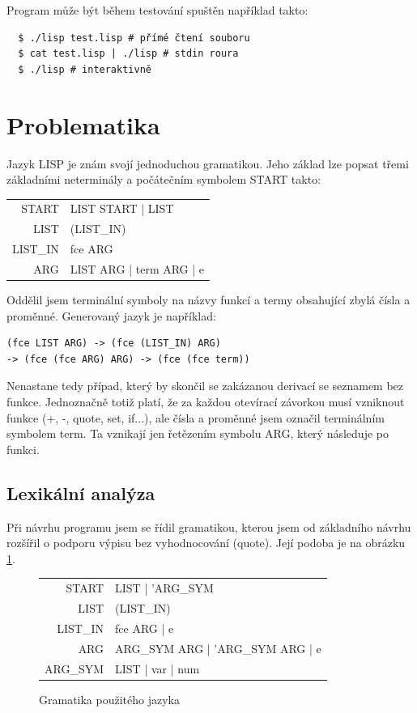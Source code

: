 \documentclass[a4paper, 12pt]{article}
\begin{document}
Program může být během testování spuštěn například takto:
\begin{verbatim}
  $ ./lisp test.lisp # přímé čtení souboru
  $ cat test.lisp | ./lisp # stdin roura
  $ ./lisp # interaktivně
\end{verbatim}

\section{Problematika}
Jazyk LISP je znám svojí jednoduchou gramatikou.
Jeho základ lze popsat třemi základními neterminály a počátečním
symbolem START takto: 

\medskip

\begin{tabular}{r@{$\quad\longrightarrow\quad$}l}
START & LIST START | LIST\\
LIST & (LIST\_IN)\\
LIST\_IN & fce ARG\\
ARG & LIST ARG | term ARG | e
\end{tabular}

Oddělil jsem terminální symboly na názvy funkcí a termy obsahující
zbylá čísla a proměnné. Generovaný jazyk je například:

\begin{verbatim}
(fce LIST ARG) -> (fce (LIST_IN) ARG)
-> (fce (fce ARG) ARG) -> (fce (fce term))
\end{verbatim}

Nenastane tedy případ, který by skončil se zakázanou derivací
se seznamem bez funkce.
Jednoznačně totiž platí, že za každou otevírací závorkou musí
vzniknout funkce (+, -, quote, set, if...), ale čísla a proměnné
jsem označil terminálním symbolem term. Ta vznikají jen řetězením
symbolu ARG, který následuje po funkci.

\subsection{Lexikální analýza}
Při návrhu programu jsem se řídil gramatikou, kterou jsem od
základního návrhu rozšířil o podporu výpisu bez vyhodnocování (quote).
Její podoba je na obrázku \ref{fig:gram}.

\begin{figure}
\centering
\begin{tabular}{r@{$\quad\longrightarrow\quad$}l}
START & LIST | 'ARG\_SYM\\
LIST & (LIST\_IN)\\
LIST\_IN & fce ARG | e\\
ARG & ARG\_SYM ARG | 'ARG\_SYM ARG | e\\
ARG\_SYM & LIST | var | num
\end{tabular}
\caption{Gramatika použitého jazyka}
\label{fig:gram}
\end{figure}
\end{document}
